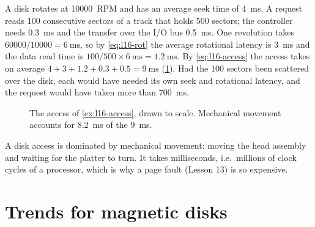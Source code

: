 \documentclass[../main.tex]{subfiles}
\begin{document}
\begin{example}
  \label{ex:l16-access}
  A disk rotates at \num{10000}~RPM and has an average seek time of
  \SI{4}{\milli\second}.  A request reads 100 consecutive sectors of a track
  that holds 500 sectors; the controller needs \SI{0.3}{\milli\second} and
  the transfer over the I/O bus \SI{0.5}{\milli\second}.  One revolution
  takes $\num{60000}/\num{10000} = \SI{6}{\milli\second}$, so by
  \cref{eq:l16-rot} the average rotational latency is
  \SI{3}{\milli\second} and the data read time is $100/500 \times
  \SI{6}{\milli\second} = \SI{1.2}{\milli\second}$.  By
  \cref{eq:l16-access} the access takes on average $4 + 3 + 1.2 + 0.3 + 0.5
  = \SI{9}{\milli\second}$ (\cref{fig:l16-access-time}).  Had the 100
  sectors been scattered over the disk, each would have needed its own seek
  and rotational latency, and the request would have taken more than
  \SI{700}{\milli\second}.
\end{example}

\begin{figure}[htbp]
  \centering
  
  \caption{The access of \cref{ex:l16-access}, drawn to scale.  Mechanical
    movement accounts for \SI{8.2}{\milli\second} of the
    \SI{9}{\milli\second}.}
  \label{fig:l16-access-time}
\end{figure}


\begin{keypoint}
  A disk access is dominated by mechanical movement: moving the head
  assembly and waiting for the platter to turn.  It takes milliseconds,
  i.e.\ millions of clock cycles of a processor, which is why a page fault
  (Lesson 13) is so expensive.
\end{keypoint}

\section{Trends for magnetic disks}
\label{sec:l16-trends}
\end{document}
